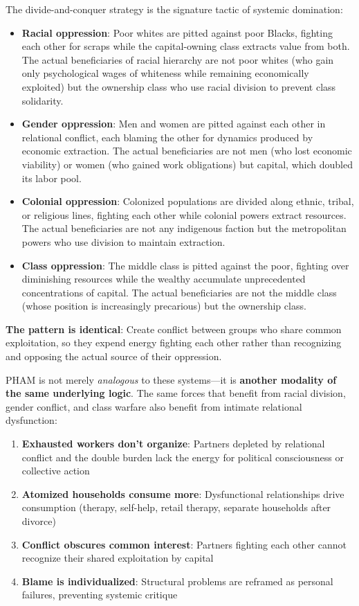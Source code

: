 \documentclass[12pt, letterpaper]{article}
\begin{document}
The divide-and-conquer strategy is the signature tactic of systemic domination:

\begin{itemize}
    \item \textbf{Racial oppression}: Poor whites are pitted against poor Blacks, fighting each other for scraps while the capital-owning class extracts value from both. The actual beneficiaries of racial hierarchy are not poor whites (who gain only psychological wages of whiteness while remaining economically exploited) but the ownership class who use racial division to prevent class solidarity.
    
    \item \textbf{Gender oppression}: Men and women are pitted against each other in relational conflict, each blaming the other for dynamics produced by economic extraction. The actual beneficiaries are not men (who lost economic viability) or women (who gained work obligations) but capital, which doubled its labor pool.
    
    \item \textbf{Colonial oppression}: Colonized populations are divided along ethnic, tribal, or religious lines, fighting each other while colonial powers extract resources. The actual beneficiaries are not any indigenous faction but the metropolitan powers who use division to maintain extraction.
    
    \item \textbf{Class oppression}: The middle class is pitted against the poor, fighting over diminishing resources while the wealthy accumulate unprecedented concentrations of capital. The actual beneficiaries are not the middle class (whose position is increasingly precarious) but the ownership class.
\end{itemize}

\textbf{The pattern is identical}: Create conflict between groups who share common exploitation, so they expend energy fighting each other rather than recognizing and opposing the actual source of their oppression.

PHAM is not merely \textit{analogous} to these systems---it is \textbf{another modality of the same underlying logic}. The same forces that benefit from racial division, gender conflict, and class warfare also benefit from intimate relational dysfunction:

\begin{enumerate}
    \item \textbf{Exhausted workers don't organize}: Partners depleted by relational conflict and the double burden lack the energy for political consciousness or collective action
    \item \textbf{Atomized households consume more}: Dysfunctional relationships drive consumption (therapy, self-help, retail therapy, separate households after divorce)
    \item \textbf{Conflict obscures common interest}: Partners fighting each other cannot recognize their shared exploitation by capital
    \item \textbf{Blame is individualized}: Structural problems are reframed as personal failures, preventing systemic critique
\end{enumerate}
\end{document}
